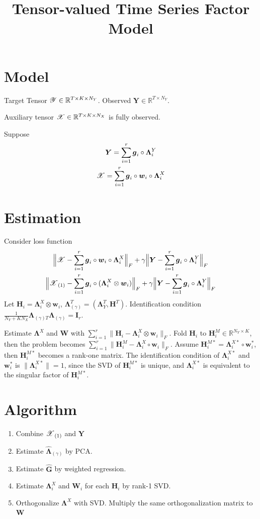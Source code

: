 \documentclass[12pt]{article}
\title{\vspace{-20pt} Tensor-valued Time Series Factor Model}
\newcommand{\bm}{\boldsymbol}
\newcommand{\cm}[1]{\mbox{\boldmath$\mathscr{#1}$}}
\numberwithin{equation}{section}
\begin{document}
	
\section{Model}
Target Tensor $\cm{Y}\in\mathbb{R}^{T\times K\times N_Y}$. Observed $\bm{Y}\in\mathbb{R}^{T\times N_Y}$.

Auxiliary tensor $\cm{X}\in\mathbb{R}^{T\times K\times N_X}$ is fully observed.

Suppose
\begin{gather}
	\bm{Y}=\sum_{i=1}^r\bm{g}_i\circ\bm{\Lambda}_i^Y\\
	\cm{X}=\sum_{i=1}^r\bm{g}_i\circ\bm{w}_i\circ\bm{\Lambda}_i^X
\end{gather}

\section{Estimation}
Consider loss function
\begin{gather}
	\Big\lVert\cm{X}-\sum_{i=1}^r\bm{g}_i\circ\bm{w}_i\circ\bm{\Lambda}_i^X \Big\rVert_F+\gamma\Big\lVert\bm{Y}-\sum_{i=1}^r\bm{g}_i\circ\bm{\Lambda}_i^Y\Big\rVert_F\\
	\Big\lVert\cm{X}_{(1)}-\sum_{i=1}^r\bm{g}_i\circ(\bm{\Lambda}_i^X\otimes\bm{w}_i)\Big\rVert_F+\gamma\Big\lVert\bm{Y}-\sum_{i=1}^r\bm{g}_i\circ\bm{\Lambda}_i^Y\Big\rVert_F
\end{gather}
Let $\bm{H}_i = \bm{\Lambda}_i^X\otimes\bm{w}_i$, $\bm{\Lambda}_{(\gamma)}^T=(\bm{\Lambda}_Y^T, \bm{H}^T)$. Identification condition $\frac{1}{N_Y+KN_X}\bm{\Lambda}_{(\gamma)T}\bm{\Lambda}_{(\gamma)}=\bm{I}_r$. 

Estimate $\bm{\Lambda}^X$ and $\bm{W}$ with $\sum_{i=1}^r\lVert\bm{H}_i-\bm{\Lambda}_i^X\otimes\bm{w}_i\rVert_F$. Fold $\bm{H}_i$ to $\bm{H}_i^M\in\mathbb{R}^{N_Y\times K}$, then the problem becomes $\sum_{i=1}^r\lVert\bm{H}_i^M-\bm{\Lambda}_i^X\circ\bm{w}_i\rVert_F$. Assume $\bm{H}_i^{M*}=\bm{\Lambda}_i^{X*}\circ\bm{w}_i^*$, then $\bm{H}_i^{M*}$ becomes a rank-one matrix. The identification condition of $\bm{\Lambda}_i^{X*}$ and $\bm{w}_i^*$ is $\lVert\bm{\Lambda}_i^{X*}\rVert=1$, since the SVD of $\bm{H}_i^{M*}$ is unique, and $\bm{\Lambda}_i^{X*}$ is equivalent to the singular factor of $\bm{H}_i^{M*}$. 

\section{Algorithm}
\begin{enumerate}
	\item Combine $\cm{X}_{(1)}$ and $\bm{Y}$
	\item Estimate $\widehat{\bm{\Lambda}}_{(\gamma)}$ by PCA.
	\item Estimate $\widehat{\bm{G}}$ by weighted regression.
	\item Estimate $\bm{\Lambda}_{i}^X$ and $\bm{W}_i$ for each $\bm{H}_i$ by rank-1 SVD.
	\item Orthogonalize $\bm{\Lambda}^X$ with SVD. Multiply the same orthogonalization matrix to $\bm{W}$ 
\end{enumerate}
\end{document}
